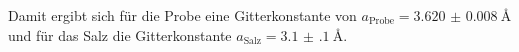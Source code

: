 Damit ergibt sich für die Probe eine Gitterkonstante von $a_{\mathrm{Probe}} = \SI{3.620(8)}{\angstrom}$
und für das Salz die Gitterkonstante $a_{\mathrm{Salz}} = \SI{3.1(1)}{\angstrom}$.



\FloatBarrier


\FloatBarrier
